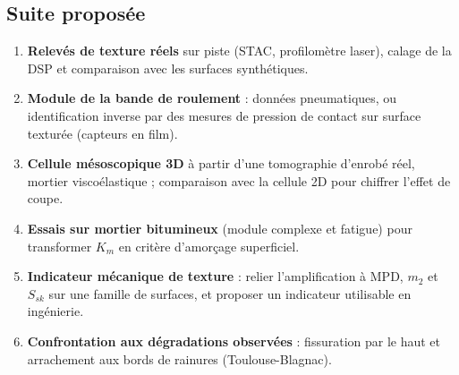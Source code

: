 \subsection{Suite proposée}
\begin{enumerate}[nosep]
\item \textbf{Relevés de texture réels} sur piste (STAC, profilomètre laser), calage de la DSP et
      comparaison avec les surfaces synthétiques.
\item \textbf{Module de la bande de roulement} : données pneumatiques, ou identification inverse
      par des mesures de pression de contact sur surface texturée (capteurs en film).
\item \textbf{Cellule mésoscopique 3D} à partir d'une tomographie d'enrobé réel, mortier
      viscoélastique ; comparaison avec la cellule 2D pour chiffrer l'effet de coupe.
\item \textbf{Essais sur mortier bitumineux} (module complexe et fatigue) pour transformer
      $K_m$ en critère d'amorçage superficiel.
\item \textbf{Indicateur mécanique de texture} : relier l'amplification à MPD, $m_2$ et $S_{sk}$
      sur une famille de surfaces, et proposer un indicateur utilisable en ingénierie.
\item \textbf{Confrontation aux dégradations observées} : fissuration par le haut et arrachement
      aux bords de rainures (Toulouse-Blagnac).
\end{enumerate}

